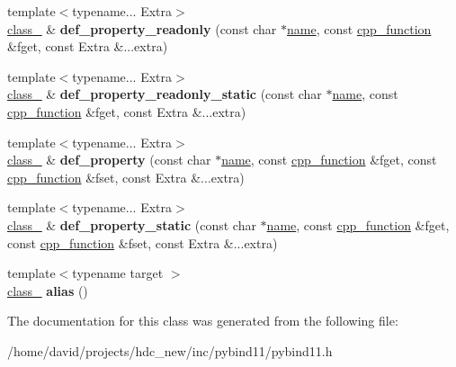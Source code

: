 \begin{DoxyCompactItemize}
\item 
{\footnotesize template$<$typename... Extra$>$ }\\\hyperlink{classclass__}{class\+\_\+} \& {\bfseries def\+\_\+property\+\_\+readonly} (const char $\ast$\hyperlink{structname}{name}, const \hyperlink{classcpp__function}{cpp\+\_\+function} \&fget, const Extra \&...extra)\hypertarget{classclass___a2c0a989148ada660c8a43bc6a2ee049a}{}\label{classclass___a2c0a989148ada660c8a43bc6a2ee049a}

\item 
{\footnotesize template$<$typename... Extra$>$ }\\\hyperlink{classclass__}{class\+\_\+} \& {\bfseries def\+\_\+property\+\_\+readonly\+\_\+static} (const char $\ast$\hyperlink{structname}{name}, const \hyperlink{classcpp__function}{cpp\+\_\+function} \&fget, const Extra \&...extra)\hypertarget{classclass___a3a8781d6c4df15fc3054d9fb27bcdd86}{}\label{classclass___a3a8781d6c4df15fc3054d9fb27bcdd86}

\item 
{\footnotesize template$<$typename... Extra$>$ }\\\hyperlink{classclass__}{class\+\_\+} \& {\bfseries def\+\_\+property} (const char $\ast$\hyperlink{structname}{name}, const \hyperlink{classcpp__function}{cpp\+\_\+function} \&fget, const \hyperlink{classcpp__function}{cpp\+\_\+function} \&fset, const Extra \&...extra)\hypertarget{classclass___a87f8298be2bd9ef3802225575511a8d9}{}\label{classclass___a87f8298be2bd9ef3802225575511a8d9}

\item 
{\footnotesize template$<$typename... Extra$>$ }\\\hyperlink{classclass__}{class\+\_\+} \& {\bfseries def\+\_\+property\+\_\+static} (const char $\ast$\hyperlink{structname}{name}, const \hyperlink{classcpp__function}{cpp\+\_\+function} \&fget, const \hyperlink{classcpp__function}{cpp\+\_\+function} \&fset, const Extra \&...extra)\hypertarget{classclass___aa193a7c07eed17a4efca57d7077b20e0}{}\label{classclass___aa193a7c07eed17a4efca57d7077b20e0}

\item 
{\footnotesize template$<$typename target $>$ }\\\hyperlink{classclass__}{class\+\_\+} {\bfseries alias} ()\hypertarget{classclass___a395207adafcb1204be4ecd710180a73f}{}\label{classclass___a395207adafcb1204be4ecd710180a73f}

\end{DoxyCompactItemize}


The documentation for this class was generated from the following file\+:\begin{DoxyCompactItemize}
\item 
/home/david/projects/hdc\+\_\+new/inc/pybind11/pybind11.\+h\end{DoxyCompactItemize}
